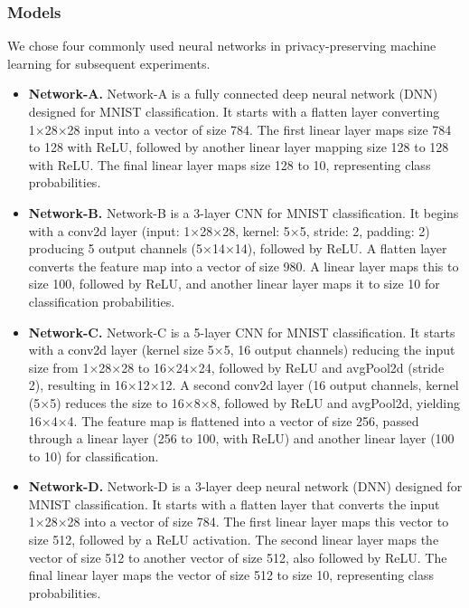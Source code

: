 \documentclass[conference]{IEEEtran}
\begin{document}
\subsubsection{Models}
We chose four commonly used neural networks in privacy-preserving machine learning \cite{liu2024pencilprivateextensiblecollaborative} for subsequent experiments.


\begin{itemize}
    \item \textbf{Network-A.}
    Network-A is a fully connected deep neural network (DNN) designed for MNIST classification. It starts with a flatten layer converting 1×28×28 input into a vector of size 784. The first linear layer maps size 784 to 128 with ReLU, followed by another linear layer mapping size 128 to 128 with ReLU. The final linear layer maps size 128 to 10, representing class probabilities.
    \item \textbf{Network-B.}
    Network-B is a 3-layer CNN for MNIST classification. It begins with a conv2d layer (input: 1×28×28, kernel: 5×5, stride: 2, padding: 2) producing 5 output channels (5×14×14), followed by ReLU. A flatten layer converts the feature map into a vector of size 980. A linear layer maps this to size 100, followed by ReLU, and another linear layer maps it to size 10 for classification probabilities.
    \item \textbf{Network-C.}
    Network-C is a 5-layer CNN for MNIST classification. It starts with a conv2d layer (kernel size 5×5, 16 output channels) reducing the input size from 1×28×28 to 16×24×24, followed by ReLU and avgPool2d (stride 2), resulting in 16×12×12. A second conv2d layer (16 output channels, kernel (5×5) reduces the size to 16×8×8, followed by ReLU and avgPool2d, yielding 16×4×4. The feature map is flattened into a vector of size 256, passed through a linear layer (256 to 100, with ReLU) and another linear layer (100 to 10) for classification.
    \item \textbf{Network-D.}
    Network-D is a 3-layer deep neural network (DNN) designed for MNIST classification. It starts with a flatten layer that converts the input 1×28×28 into a vector of size 784. The first linear layer maps this vector to size 512, followed by a ReLU activation. The second linear layer maps the vector of size 512 to another vector of size 512, also followed by ReLU. The final linear layer maps the vector of size 512 to size 10, representing class probabilities.
    

\end{itemize}
\end{document}
